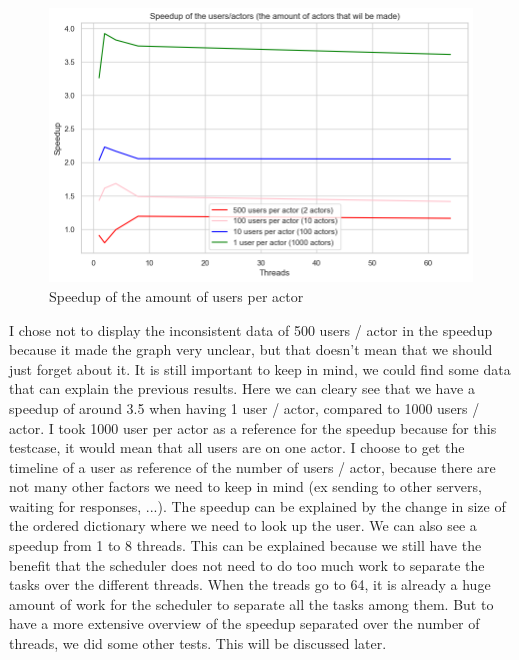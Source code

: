 \documentclass[a4paper]{article}
\begin{document}
\begin{figure}[H]
	\centering
	\includegraphics[width = \linewidth]{Images/Speedup(U:A).png}
	\caption{Speedup of the amount of users per actor}
\end{figure}
I chose not to display the inconsistent data of 500 users / actor in the speedup because it made the graph very unclear, but that doesn't mean that we should just forget about it. It is still important to keep in mind, we could find some data that can explain the previous results. Here we can cleary see that we have a speedup of around 3.5 when having 1 user / actor, compared to 1000 users / actor. I took 1000 user per actor as a reference for the speedup because for this testcase, it would mean that all users are on one actor. I choose to get the timeline of a user as reference of the number of users / actor, because there are not many other factors we need to keep in mind (ex sending to other servers, waiting for responses, ...). The speedup can be explained by the change in size of the ordered dictionary where we need to look up the user. We can also see a speedup from 1 to 8 threads. This can be explained because we still have the benefit that the scheduler does not need to do too much work to separate the tasks over the different threads. When the treads go to 64, it is already a huge amount of work for the scheduler to separate all the tasks among them. But to have a more extensive overview of the speedup separated over the number of threads, we did some other tests. This will be discussed later.  
\end{document}
